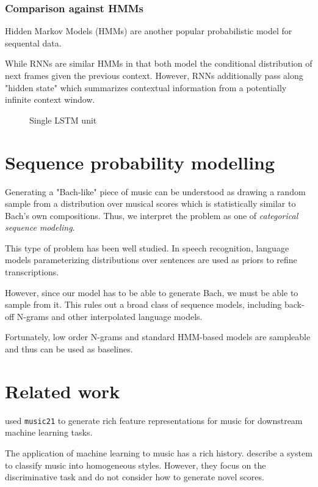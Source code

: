 \subsubsection{Comparison against HMMs}

Hidden Markov Models (HMMs) are another popular probabilistic model for
sequental data. 

While RNNs are similar HMMs in that both model the conditional distribution of
next frames given the previous context. However, RNNs additionally pass along
"hidden state" which summarizes contextual information from a potentially
infinite context window.


\begin{figure}[htpb]
    \centering
    
    \caption{Single LSTM unit}
    \label{fig:lstm-unit}
\end{figure}


\section{Sequence probability modelling}

Generating a "Bach-like" piece of music can be understood as drawing a random
sample from a distribution over musical scores which is statistically similar
to Bach's own compositions. Thus, we interpret the problem as one of
\emph{categorical sequence modeling}.

This type of problem has been well studied. In speech recognition, language
models parameterizing distributions over sentences are used as priors to refine
transcriptions.

However, since our model has to be able to generate Bach, we must be able to
sample from it. This rules out a broad class of sequence models, including
back-off N-grams and other interpolated language models.

Fortunately, low order N-grams and standard HMM-based models are sampleable and
thus can be used as baselines.

\section{Related work}

\cite{Cuthbert2011} used
\texttt{music21} to generate rich feature representations for music for
downstream machine learning tasks.

The application of machine learning to music has a rich history.
\cite{Herlands2014} describe a system to classify music into homogeneous
styles. However, they focus on the discriminative task and do not consider
how to generate novel scores.


